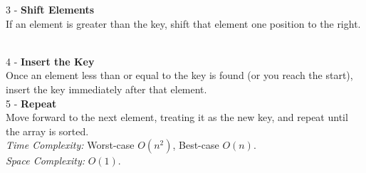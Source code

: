 \documentclass[a4paper]{extarticle}
\newcommand{\algofont}{\fontsize{4.3pt}{4.7pt}\selectfont}
\newcommand{\algocode}[1]{%
  \vspace{0pt}%
  \begin{algorithm}[H]
    \setlength{\abovecaptionskip}{0pt}%
    \setlength{\belowcaptionskip}{0pt}
    \setlength{\intextsep}{0pt}%
    \setlength{\textfloatsep}{0pt}
    \algofont  %
  \end{algorithm}%
  \vspace{0pt}%
}
\begin{document}
\begin{paracol}{3}
{\begin{minipage}[t]{1.02\linewidth}
\begin{minipage}[htp]{0.48\linewidth}
3 - \textbf{Shift Elements}\\ 
If an element is greater than the key, shift that element one position to the right.
\end{minipage}%
\hfill
\begin{minipage}[htp]{0.52\linewidth}
\algocode{insertion-sort}
\end{minipage}\\[-10px]
4 - \textbf{Insert the Key}\\
Once an element less than or equal to the key is found (or you reach the start), insert the key immediately after that element.\\
5 - \textbf{Repeat}\\ 
Move forward to the next element, treating it as the new key, and repeat until the array is sorted.\\
\textit{Time Complexity:} Worst-case $O(n^2)$, Best-case $O(n)$.\\
\textit{Space Complexity:} $O(1)$.
\end{minipage}%
}\\
\end{paracol}
\end{document}
